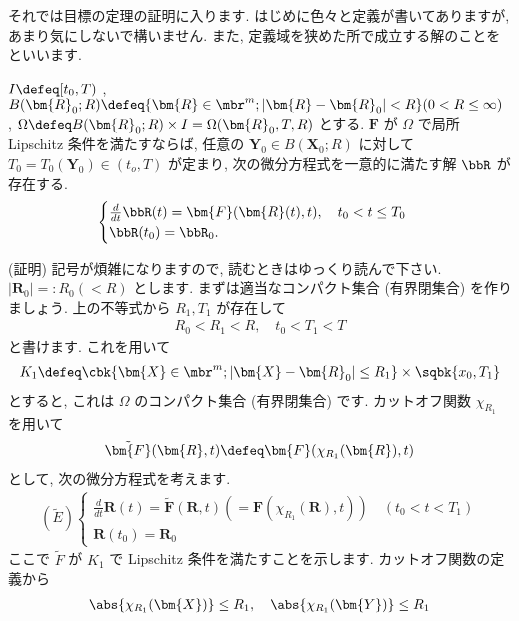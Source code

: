 \documentclass[openany, a4paper, oneside]{jsbook}
\begin{document}
それでは目標の定理の証明に入ります.
はじめに色々と定義が書いてありますが, あまり気にしないで構いません.
また, 定義域を狭めた所で成立する解のことを
といいます.
\begin{thm}[局所解の存在と一意性]
$I \defeq [t_0 , T)$ , $B ( \bm{R}_0 ; R ) \defeq \{ \bm{R} \in \mbr^m ; | \bm{R} - \bm{R}_0 | <R \} ( 0 < R \leq \infty)$ ,
$\Omega \defeq B ( \bm{R}_0 ; R) \times I = \Omega ( \bm{R}_0 ,T ,R)$ とする.
$\bm{F}$ が $\Omega$ で局所 Lipschitz 条件を満たすならば,
任意の $\bm{Y}_0 \in B ( \bm{X}_0 ;R )$ に対して
$T_0 = T_0 (\bm{Y}_0) \in (t_o ,T)$ が定まり,
次の微分方程式を一意的に満たす解 $\bbR$ が存在する.
\begin{gather}
\begin{cases}
\frac{d} {dt} \bbR (t) = \bm{F} ( \bm{R} (t) , t ), \quad t_0 < t \leq T_0 \\
\bbR (t_0) = \bbR_0 .
\end{cases}
\end{gather}
\label{th:解の一意性存在定理 2}
\end{thm}
(証明)
記号が煩雑になりますので, 読むときはゆっくり読んで下さい.
$| \bm{R}_0 | =: R_0 ( < R )$ とします.
まずは適当なコンパクト集合 (有界閉集合) を作りましょう.
上の不等式から $R_1, T_1$ が存在して
\begin{gather}
R_0 < R_1 < R
, \quad
t_0 < T_1 < T
\label{eq:4-1.72}
\end{gather}
と書けます.
これを用いて
\begin{gather}
K_1
\defeq
\cbk{\bm{X} \in \mbr^m ; | \bm{X} - \bm{R}_0 | \leq R_1}  \times \sqbk{x_0 , T_1}
\end{gather}
とすると, これは $\Omega$ のコンパクト集合 (有界閉集合) です.
カットオフ関数 $\chi_{R_1}$ を用いて
\begin{gather}
\tilde{\bm{F}} ( \bm{R} , t )
\defeq
\bm{F} ( \chi_{R_1} ( \bm{R} ) , t )
\end{gather}
として, 次の微分方程式を考えます.
\begin{gather}
( \tilde{E} )
\begin{cases}
\frac{d} {dt} \bm{R} (t)
=
\tilde{ \bm{F} } ( \bm{R} , t )
( = \bm{F} ( \chi_{R_1} ( \bm{R} ) , t ) ) \quad ( t_0 < t < T_1 )\\
\bm{R}  ( t_0 )
=
\bm{R}_0
\end{cases}
\end{gather}
ここで $\tilde{F}$ が $K_1$ で Lipschitz 条件を満たすことを示します.
カットオフ関数の定義から
\begin{gather}
\abs{\chi _{R_1} ( \bm{X} )} \leq R_1  , \quad
\abs{\chi _{R_1} ( \bm{Y} )} \leq R_1
\end{gather}
\end{document}
